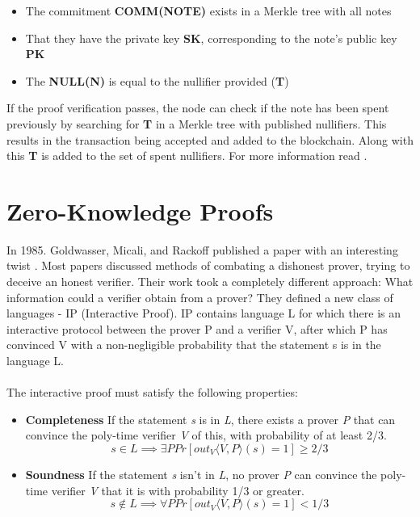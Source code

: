 \begin{itemize}
    \item The commitment \textbf{COMM(NOTE)} exists in a Merkle tree with all notes
    \item That they have the private key \textbf{SK}, corresponding to the note's public key \textbf{PK}
    \item The \textbf{NULL(N)} is equal to the nullifier provided (\textbf{T})
\end{itemize}

If the proof verification passes, the node can check if the note has been spent previously by searching for \textbf{T} in a Merkle tree with published nullifiers. This results in the transaction being accepted and added to the blockchain. Along with this \textbf{T} is added to the set of spent nullifiers. For more information read \cite{zcashzksnarks, zcashprotocol}.


\section{Zero-Knowledge Proofs}

In 1985. Goldwasser, Micali, and Rackoff published a paper with an interesting twist \cite{goldwasser1985knowledge}. Most papers discussed methods of combating a dishonest prover, trying to deceive an honest verifier. Their work took a completely different approach: What information could a verifier obtain from a prover? They defined a new class of languages - IP (Interactive Proof). IP contains language L for which there is an interactive protocol between the prover P and a verifier V, after which P has convinced V with a non-negligible probability that the statement s is in the language L.\\
\\
The interactive proof must satisfy the following properties:
\begin{itemize}
    \item \textbf{Completeness} If the statement \textit{s} is in \textit{L}, there exists a prover \textit{P} that can convince the poly-time verifier \textit{V} of this, with probability of at least 2/3.
    $$ s \in L \implies \exists P Pr[out_V \langle V, P \rangle (s) = 1 ] \geq 2/3 $$
    \item \textbf{Soundness} If the statement \textit{s} isn't in \textit{L}, no prover \textit{P} can convince the poly-time verifier \textit{V} that it is with probability 1/3 or greater.
    $$ s \notin L \implies \forall P Pr[out_V \langle V, P \rangle (s) = 1 ] < 1/3 $$
\end{itemize}

